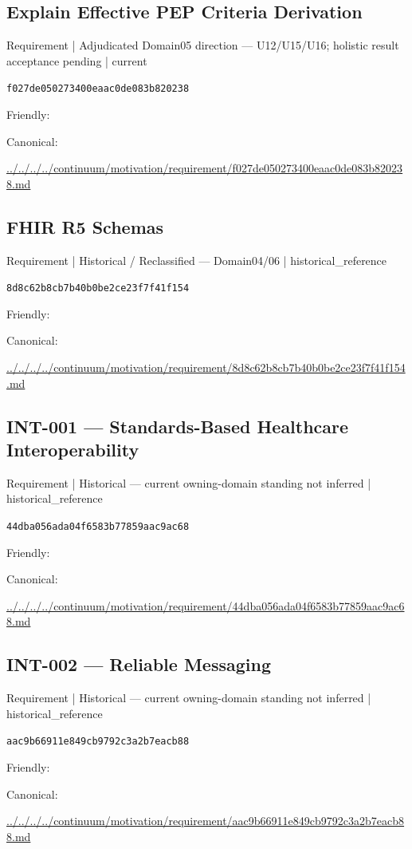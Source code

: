 \documentclass[10pt,a4paper]{article}
\begin{document}
\subsection*{Explain Effective PEP Criteria Derivation}
{\small Requirement | Adjudicated Domain05 direction — U12/U15/U16; holistic result acceptance pending | current}\par
\texttt{f027de050273400eaac0de083b820238}\par
Friendly: \par
Canonical: \par
{\footnotesize\url{../../../../continuum/motivation/requirement/f027de050273400eaac0de083b820238.md}}\par
\subsection*{FHIR R5 Schemas}
{\small Requirement | Historical / Reclassified — Domain04/06 | historical\_reference}\par
\texttt{8d8c62b8cb7b40b0be2ce23f7f41f154}\par
Friendly: \par
Canonical: \par
{\footnotesize\url{../../../../continuum/motivation/requirement/8d8c62b8cb7b40b0be2ce23f7f41f154.md}}\par
\subsection*{INT-001 — Standards-Based Healthcare Interoperability}
{\small Requirement | Historical — current owning-domain standing not inferred | historical\_reference}\par
\texttt{44dba056ada04f6583b77859aac9ac68}\par
Friendly: \par
Canonical: \par
{\footnotesize\url{../../../../continuum/motivation/requirement/44dba056ada04f6583b77859aac9ac68.md}}\par
\subsection*{INT-002 — Reliable Messaging}
{\small Requirement | Historical — current owning-domain standing not inferred | historical\_reference}\par
\texttt{aac9b66911e849cb9792c3a2b7eacb88}\par
Friendly: \par
Canonical: \par
{\footnotesize\url{../../../../continuum/motivation/requirement/aac9b66911e849cb9792c3a2b7eacb88.md}}\par
\end{document}
